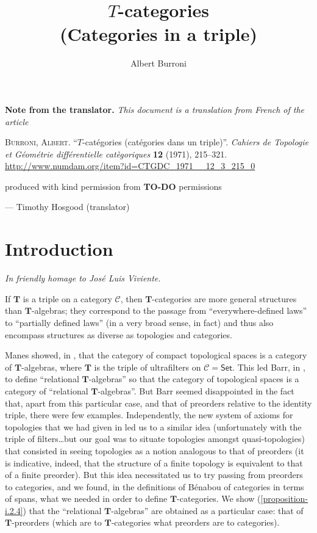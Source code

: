 \documentclass{article}
\title{$T$-categories\\(Categories in a triple)}
\author{Albert Burroni}
\date{}
\newcommand{\origcit}{%
  \textsc{Burroni, Albert.}
  ``$T$-catégories (catégories dans un triple)''.
  \emph{Cahiers de Topologie et Géométrie différentielle catègoriques} \textbf{12} (1971), 215--321.
  {\url{http://www.numdam.org/item?id=CTGDC_1971__12_3_215_0}}
}
\newenvironment{translator}[1]
  {\phantomsection\par\medskip\noindent\small\textbf{#1.}\itshape}
  {\par\medskip}
\newcommand{\oldpage}[1]{\marginpar{\footnotesize$\Big\vert$ \textit{p.~#1}}}
\newcommand{\todo}{{\color{purple}\textbf{TO-DO }}}
\newcommand{\cat}[1]{\mathcal{#1}}
\newcommand{\Cat}[1]{\mathsf{#1}}
\newcommand{\TT}{\mathbf{T}}
\begin{document}
\maketitle

\begin{translator}{Note from the translator}
  This document is a translation from French of the article

  \medskip
  {\normalfont\origcit}

  \medskip
  {\noindent}produced with kind permission from \todo{permissions}
  
  \hfill--- Timothy Hosgood (translator)
\end{translator}



\section*{Introduction}

\hfill\emph{In friendly homage to José Luis Viviente.}

\bigskip

\oldpage{215}
If $\TT$ is a triple on a category $\cat{C}$, then $\TT$-categories are more general structures than $\TT$-algebras; they correspond to the passage from ``everywhere-defined laws'' to ``partially defined laws'' (in a very broad sense, in fact) and thus also encompass structures as diverse as topologies and categories.

Manes showed, in \cite{Ma}, that the category of compact topological spaces is a category of $\TT$-algebras, where $\TT$ is the triple of ultrafilters on $\cat{C}=\Cat{Set}$.
This led Barr, in \cite{Ba}, to define ``relational $\TT$-algebras'' so that the category of topological spaces is a category of ``relational $\TT$-algebras''.
But Barr seemed disappointed in the fact that, apart from this particular case, and that of preorders relative to the identity triple, there were few examples.
Independently, the new system of axioms for topologies that we had given in \cite{Bu} led us to a similar idea (unfortunately with the triple of filters\ldots but our goal was to situate topologies amongst quasi-topologies) that consisted in seeing topologies as a notion analogous to that of preorders (it is indicative, indeed, that the structure of a finite topology is equivalent to that of a finite preorder).
But this idea necessitated us to try passing from preorders to categories, and we found, in the definitions of Bénabou \cite{Be} of categories in terms of spans, what we needed in order to define $\TT$-categories.
We show (\cref{proposition-i.2.4}) that the ``relational $\TT$-algebras'' are obtained as a particular case: that of $\TT$-preorders (which are to $\TT$-categories what preorders are to categories).
\end{document}
